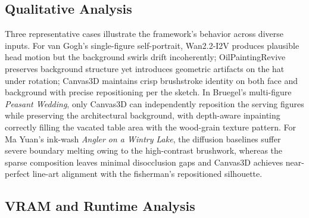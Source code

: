 \begin{table}[t]
\centering
\caption{\textbf{User study} (Likert 1--5, mean $\pm$ std). N/A: cannot
accept line-art composition input.}
\label{tab:user_study}
\end{table}

\subsection{Qualitative Analysis}

Three representative cases illustrate the framework's behavior across diverse
inputs. For van Gogh's single-figure self-portrait, Wan2.2-I2V produces
plausible head motion but the background swirls drift incoherently;
OilPaintingRevive preserves background structure yet introduces geometric
artifacts on the hat under rotation; Canvas3D maintains crisp brushstroke
identity on both face and background with precise repositioning per the sketch.
In Bruegel's multi-figure \textit{Peasant Wedding}, only Canvas3D can
independently reposition the serving figures while preserving the architectural
background, with depth-aware inpainting correctly filling the vacated table area
with the wood-grain texture pattern. For Ma Yuan's ink-wash \textit{Angler on a
Wintry Lake}, the diffusion baselines suffer severe boundary melting owing to
the high-contrast brushwork, whereas the sparse composition leaves minimal
disocclusion gaps and Canvas3D achieves near-perfect line-art alignment with the
fisherman's repositioned silhouette.

\subsection{VRAM and Runtime Analysis}

